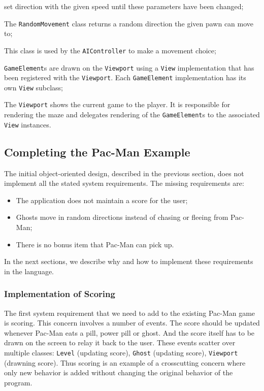 \begin{description}[noitemsep,style=sameline,leftmargin=32mm]
		set direction with the given speed until these parameters have been changed;
	\item[RandomMovement] The \lstinline|RandomMovement| class returns a random direction the given pawn can move to;
	\item[Strategy] This class is used by the \lstinline|AIController| to make a movement choice;
	\item[View] \lstinline|GameElement|s are drawn on the \lstinline|Viewport| using a \lstinline|View| implementation 
		that has been registered with the \lstinline|Viewport|.	Each \lstinline|GameElement| implementation has	its own 
		\lstinline|View| subclass;
	\item[Viewport] The \lstinline|Viewport| shows the current game to the player. It is responsible for rendering 
		the maze and delegates rendering of the \lstinline|GameElement|s to the associated \lstinline|View| instances.
\end{description}

\subsection{Completing the Pac-Man Example}

The initial object-oriented design, described in the previous section, does not implement all the stated system requirements.
The missing requirements are:
\begin{itemize}[noitemsep]
  \samepage
  \item The application does not maintain a score for the user;
  \item Ghosts move in random directions instead of chasing or fleeing from Pac-Man;
  \item There is no bonus item that Pac-Man can pick up.
\end{itemize}
In the next sections, we describe why and how to implement these requirements in the \Compose* language.

\subsubsection{Implementation of Scoring}
\label{sec:scoring_concern}

The first system requirement that we need to add to the existing Pac-Man game is scoring.
This concern involves a number of events.
The score should be updated whenever Pac-Man eats a pill, power pill or ghost.
And the score itself has to be drawn on the screen to relay it back to the user.
These events scatter over multiple classes: \lstinline|Level| (updating score), \lstinline|Ghost| (updating score), \lstinline|Viewport| (drawning score).
Thus scoring is an example of a crosscutting concern where only new behavior is added without changing the original behavior of the program.

